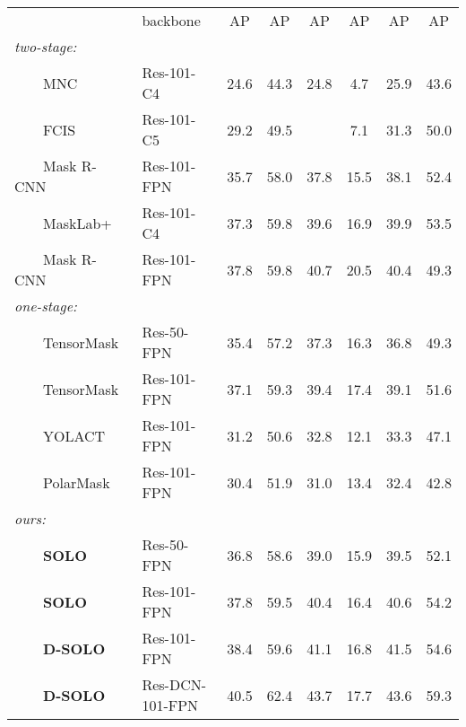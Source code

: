 \documentclass[runningheads]{llncs}
\def\OurMethod{{SOLO}\xspace}
\begin{document}
\begin{table*}[bt]
\centering
\caption{\textbf{Instance segmentation mask AP} (\%)  on the COCO \texttt{test}-\texttt{dev}. All entries are \textit{single-model} results. Here we adopt the ``6'' schedule (72 epochs), following~\cite{Chen_2019_ICCV}.
Mask R-CNN is our improved version with scale augmentation and longer training time. D-\OurMethod means Decoupled SOLO as introduced in Section \ref{sec:decouple}.
}
\begin{tabular}{ l | l |cccccc}
& backbone &AP & AP & AP&AP & AP & AP\\
\Xhline{1pt}
\emph{two-stage:} &&&&&&&\\
~~~~MNC~\cite{mnc}                    &Res-101-C4  &24.6   &44.3   &24.8   &4.7    &25.9   &43.6 \\
~~~~FCIS~\cite{fcis}                  &Res-101-C5  &29.2   &49.5   &       &7.1    &31.3   &50.0 \\
~~~~Mask R-CNN~\cite{maskrcnn}        &Res-101-FPN &35.7  &58.0   &37.8   &15.5   &38.1   &52.4 \\
~~~~MaskLab+~\cite{masklab}           &Res-101-C4  &37.3  & 59.8   & 39.6   & 16.9   & 39.9   &53.5 \\
~~~~Mask R-CNN                    &Res-101-FPN &37.8  &59.8   &40.7   &20.5   &40.4   &49.3 \\
\hline
\emph{one-stage:} &&&&&&&\\
~~~~TensorMask~\cite{Chen_2019_ICCV}  &Res-50-FPN & 35.4  & 57.2   & 37.3  &16.3   &36.8   &49.3 \\
~~~~TensorMask~\cite{Chen_2019_ICCV}  &Res-101-FPN &37.1  &59.3   &39.4   &17.4   &39.1   &51.6 \\
~~~~YOLACT~\cite{yolact}              &Res-101-FPN &31.2  &50.6   &32.8   &12.1   &33.3   &47.1 \\
~~~~PolarMask~\cite{polarmask}        &Res-101-FPN &30.4  &51.9   &31.0   &13.4   &32.4   &42.8 \\
\hline\hline
\emph{ours:} &&&&&&&\\
~~~~\textbf{\OurMethod}                            &Res-50-FPN  &  36.8 & 58.6 & 39.0 & 15.9 & 39.5 & 52.1\\
~~~~\textbf{\OurMethod}                            &Res-101-FPN  &  37.8 & 59.5 & 40.4 & 16.4 & 40.6 & 54.2\\
~~~~\textbf{D-\OurMethod ~}                            &Res-101-FPN  &  38.4 & 59.6 & 41.1 & 16.8 & 41.5 & 54.6\\
~~~~\textbf{D-\OurMethod ~}                            &Res-DCN-101-FPN &  40.5 & 62.4  & 43.7  & 17.7  & 43.6  & 59.3  \\
\end{tabular}

\label{tab:sota}
\end{table*}
\end{document}
